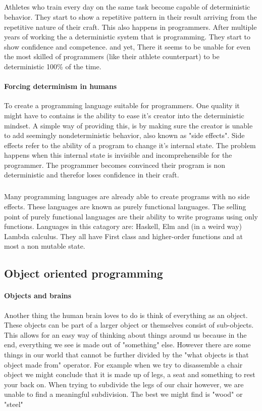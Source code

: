 \documentclass{scrartcl}
\begin{document}
    \subparagraph{}
    Athletes who train every day on the same task become
    capable of deterministic behavior. They start to show a repetitive pattern
    in their result arriving from the repetitive nature of their craft. This also
    happens in programmers. After multiple years of working the a deterministic 
    system that is programming. They start to show confidence and competence. and
    yet, There it seems to be unable for even the most skilled of programmers (like
    their athlete counterpart) to be deterministic 100\% of the time.

    \paragraph{Forcing determinism in humans}
    To create a programming language suitable for programmers. One quality it might
    have to contains is the ability to ease it's creator into the deterministic mindset.
    A simple way of providing this, is by making sure the creator is unable to add
    seemingly nondeterministic behavior, also known as "side effects". Side effects
    refer to the ability of a program to change it's internal state. The problem happens
    when this internal state is invisible and incomprehensible for the programmer.
    The programmer becomes convinced their program is non deterministic and therefor 
    loses confidence in their craft. 
    
    \subparagraph{}
    Many programming languages are already able to create programs with no
    side effects. These languages are known as purely functional languages. 
    The selling point of purely functional languages are their ability to 
    write programs using only functions. Languages in this catagory are:
    Haskell, Elm and (in a weird way) Lambda calculus. They all have First
    class and higher-order functions and at most a non mutable state.

    \subsection{Object oriented programming}
    \paragraph{Objects and brains}
    Another thing the human brain loves to do is think of everything as an object.
    These objects can be part of a larger object or themselves consist of sub-objects.
    This allows for an easy way of thinking about things around us because in the
    end, everything we see is made out of "something" else. However there are some things
    in our world that cannot be further divided by the "what objects is that object made from"
    operator. For example when we try to disassemble a chair object we might conclude that
    it is made up of legs, a seat and something to rest your back on. When trying to 
    subdivide the legs of our chair however, we are unable to find a meaningful subdivision.
    The best we might find is "wood" or "steel"
\end{document}
